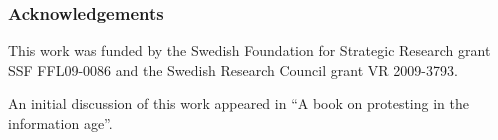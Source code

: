 \subsubsection*{Acknowledgements}

This work was funded by the Swedish Foundation for Strategic Research grant SSF 
FFL09-0086 and the Swedish Research Council grant VR 2009-3793.

An initial discussion of this work appeared in \enquote{A book on protesting in
  the information age}.
